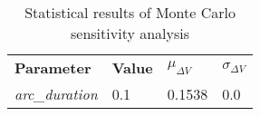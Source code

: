 
                \begin{table}[]
                \centering
                \begin{tabular}{l l l l}
                \rowcolor[HTML]{EFEFEF} \textbf{Parameter} & \textbf{Value} & \textbf{$\mu_{\Delta V}$} & \textbf{$\sigma_{\Delta V}$} \\
                \textit{arc\_duration} & 0.1 & 0.1538 & 0.0 \\

                \end{tabular}
                \caption{Statistical results of Monte Carlo sensitivity analysis}
                \label{tab:SensitivityAnalysis}
                \end{table}
                